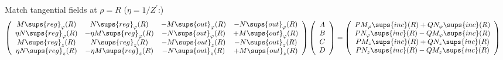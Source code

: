 \documentclass[letterpaper]{article}
\begin{document}
\noindent Match tangential fields at $\rho=R$ ($\eta=1/Z^\prime$:)
\renewcommand{\arraystretch}{1.5}
\begin{align*}
 \left(\begin{array}{cccc}
      M\sups{reg}_\varphi(R) 
  &   N\sups{reg}_\varphi(R)
  & - M\sups{out}_\varphi(R) 
  & - N\sups{out}_\varphi(R)
\\
     \eta N\sups{reg}_\varphi(R) 
  & -\eta M\sups{reg}_\varphi(R)
  & -     N\sups{out}_\varphi(R) 
  & +     M\sups{out}_\varphi(R)
\\
      M\sups{reg}_z(R)
  &   N\sups{reg}_z(R)
  &  -M\sups{out}_z(R)
  & - N\sups{out}_z(R)
\\
     \eta N\sups{reg}_z(R)
  & -\eta M\sups{reg}_z(R)
  & -     N\sups{out}_z(R)
  & +     M\sups{out}_z(R)
 \end{array}\right)
 \left(\begin{array}{c}
 A \\ B \\ C \\ D 
 \end{array}\right)
&=
 \left(\begin{array}{c}
 P M_\varphi\sups{inc}(R) + QN_\varphi\sups{inc}(R) \\
 P N_\varphi\sups{inc}(R) - QM_\varphi\sups{inc}(R) \\
 P M_z\sups{inc}(R) + QN_z\sups{inc}(R) \\
 P N_z\sups{inc}(R) - QM_z\sups{inc}(R) \\
 \end{array}\right)
\end{align*}
\renewcommand{\arraystretch}{1.0}
\end{document}
